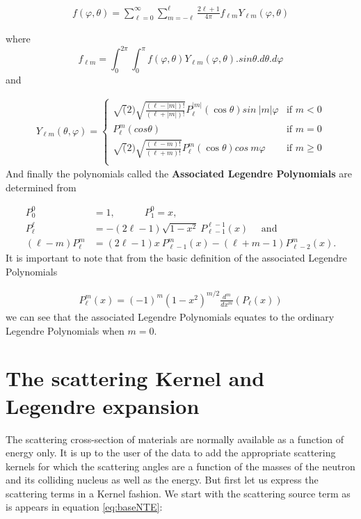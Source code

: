 \documentclass[11pt,letterpaper,titlepage]{article}
\newcommand{\beq}{\begin{equation*}
\begin{aligned}}
\newcommand{\eeq}{\end{aligned}
\end{equation*}}
\newcommand{\beqn}{\begin{equation}
	\begin{aligned}}
\newcommand{\eeqn}{\end{aligned}
	\end{equation}}
\numberwithin{equation}{section}
\begin{document}
\beqn 
f(\varphi,\theta) = \sum_{\ell = 0}^\infty \sum_{m=-\ell}^{\ell} \frac{2\ell+1}{4\pi} f_{\ell m} Y_{\ell m}(\varphi,\theta)
\eeqn 

where
$$
f_{\ell m} = \int_{0}^{2\pi} \int_0^\pi f(\varphi,\theta)Y_{\ell m}(\varphi,\theta).sin\theta.d\theta.d\varphi
$$
and

\beqn
Y_{\ell m} (\theta, \varphi )=
\begin{cases}
 \sqrt(2)\sqrt{  \frac{(\ell-|m|)!}{(\ell+|m|)!}}P_{\ell}^{|m|}(\cos\theta)sin\ {|m|\varphi}
& \text{if } m < 0 \\
 P_{\ell}^{m}(cos\theta) & \text{if } m = 0 \\
 \sqrt(2)\sqrt{    \frac{(\ell-m)!}{(\ell+m)!}}P_{\ell}^{m}(\cos\theta)cos\ {m\varphi}
& \text{if } m \ge 0 \\
\end{cases}
\eeqn
\newline
And finally the polynomials called the \textbf{Associated Legendre Polynomials} are determined from

\beqn \label{eq:AssLegendre}
P_0^0 &= 1, \quad \quad \quad
P_1^{0} = x, \\
P_\ell^\ell &= - (2\ell-1) \sqrt{1-x^2} \ P_{\ell-1}^{\ell-1}(x) \quad \text{ and}\\
(\ell - m)
P_\ell^m &= (2\ell-1)x \ P_{\ell-1}^m(x) - (\ell+m -1)P_{\ell-2}^m (x).
\eeqn
\newline
It is important to note that from the basic definition of the associated Legendre Polynomials

\beq 
P_\ell^m(x) = (-1)^m (1-x^2)^{m/2} \frac{d^m}{dx^m} (P_\ell (x))
\eeq 
\newline
we can see that the associated Legendre Polynomials equates to the ordinary Legendre Polynomials when $m=0$.

\newpage
{}
\section{The scattering Kernel and Legendre expansion}
The scattering cross-section of materials are normally available as a function of energy only. It is up to the user of the data to add the appropriate scattering kernels for which the scattering angles are a function of the masses of the neutron and its colliding nucleus as well as the energy. But first let us express the scattering terms in a Kernel fashion. We start with the scattering source term as is appears in equation \ref{eq:baseNTE}:
\end{document}
